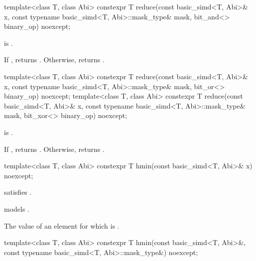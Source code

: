 \begin{itemdecl}
template<class T, class Abi>
  constexpr T reduce(const basic_simd<T, Abi>& x, const typename basic_simd<T, Abi>::mask_type& mask,
                     bit_and<> binary_op) noexcept;
\end{itemdecl}

\begin{itemdescr}
  \pnum\constraints
   is .

  \pnum\returns
  If , returns . Otherwise, returns  \forallmaskedi.
\end{itemdescr}

\begin{itemdecl}
template<class T, class Abi>
  constexpr T reduce(const basic_simd<T, Abi>& x, const typename basic_simd<T, Abi>::mask_type& mask,
                     bit_or<> binary_op) noexcept;
template<class T, class Abi>
  constexpr T reduce(const basic_simd<T, Abi>& x, const typename basic_simd<T, Abi>::mask_type& mask,
                     bit_xor<> binary_op) noexcept;
\end{itemdecl}

\begin{itemdescr}
  \pnum\constraints
   is .

  \pnum\returns
  If , returns . Otherwise, returns  \forallmaskedi.
\end{itemdescr}

\begin{itemdecl}
template<class T, class Abi> constexpr T hmin(const basic_simd<T, Abi>& x) noexcept;
\end{itemdecl}

\begin{itemdescr}
  \pnum\constraints
   satisfies .

  \pnum\expects
   models .

  \pnum\returns
  The value of an element  for which  is  \foralli.
\end{itemdescr}

\begin{itemdecl}
template<class T, class Abi>
  constexpr T hmin(const basic_simd<T, Abi>&, const typename basic_simd<T, Abi>::mask_type&) noexcept;
\end{itemdecl}

